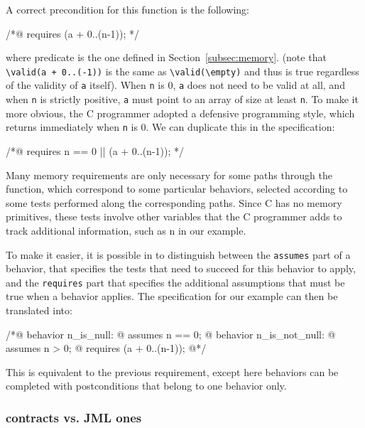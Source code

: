 \noindent
A correct precondition for this function is the following:

\begin{listing-nonumber}
/*@ requires \valid(a + 0..(n-1)); */
\end{listing-nonumber}

where predicate \valid is the one defined in Section~\ref{subsec:memory}.
(note that \lstinline|\valid(a + 0..(-1))| is the same as
\lstinline|\valid(\empty)| and thus is true regardless of the validity of
\lstinline|a| itself).
When \lstinline|n| is 0, \lstinline|a| does
not need to be valid at all, and when \lstinline|n| is strictly
positive, \lstinline|a| must point to an array of size at least
\lstinline|n|. To make it more obvious, the C programmer adopted a
defensive programming style, which returns immediately when \lstinline|n| is
0. We can duplicate this in the specification:

\begin{listing-nonumber}
/*@ requires n == 0 || \valid(a + 0..(n-1)); */
\end{listing-nonumber}

Many memory requirements are only necessary for some paths
through the function, which correspond to some particular
behaviors, selected according to some tests performed along the
corresponding paths. Since C has no memory
primitives, these tests involve other variables that the C programmer
adds to track additional information, such as {\ttfamily n} in our example.

To make it easier, it is possible in \acsl to distinguish between the
\lstinline|assumes| part of a behavior, that specifies the tests that need
to succeed for this behavior to apply, and the \lstinline|requires| part
that specifies the additional assumptions that must be true when a
behavior applies. The specification for our example can then be
translated into:

\begin{listing}{1}
/*@ behavior n_is_null:
  @   assumes n == 0;
  @ behavior n_is_not_null:
  @   assumes n > 0;
  @   requires \valid(a + 0..(n-1));
  @*/
\end{listing}

This is equivalent to the previous requirement, except here behaviors
can be completed with postconditions that belong to one behavior only.

\subsubsection*{\acsl contracts vs. JML ones}

